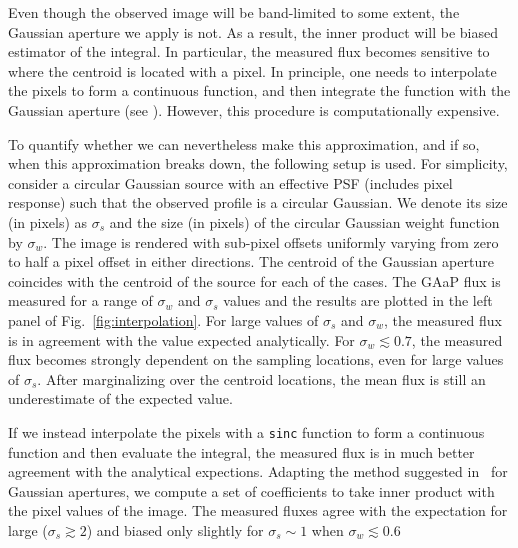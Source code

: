 \documentclass[DM,lsstdraft, authoryear,toc]{lsstdoc}
\begin{document}
Even though the observed image will be band-limited to some extent, the Gaussian aperture we apply is not.
As a result, the inner product will be biased estimator of the integral.
In particular, the measured flux becomes sensitive to where the centroid is located with a pixel.
In principle, one needs to interpolate the pixels to form a continuous function, and then integrate the function with the Gaussian aperture (see \cite{2013MNRAS.431.1275B}).
However, this procedure is computationally expensive.


To quantify whether we can nevertheless make this approximation, and if so, when this approximation breaks down, the following setup is used.
For simplicity, consider a circular Gaussian source with an effective PSF (includes pixel response) such that the observed profile is a circular Gaussian.
We denote its size (in pixels) as $\sigma_s$ and the size (in pixels) of the circular Gaussian weight function by $\sigma_w$.
The image is rendered with sub-pixel offsets uniformly varying from zero to half a pixel offset in either directions.
The centroid of the Gaussian aperture coincides with the centroid of the source for each of the cases.
The GAaP flux is measured for a range of $\sigma_w$ and $\sigma_s$ values and the results are plotted in the left panel of Fig.~\ref{fig:interpolation}.
For large values of $\sigma_s$ and $\sigma_w$, the measured flux is in agreement with the value expected analytically.
For $\sigma_w \lesssim 0.7$, the measured flux becomes strongly dependent on the sampling locations, even for large values of $\sigma_s$.
After marginalizing over the centroid locations, the mean flux is still an underestimate of the expected value.

If we instead interpolate the pixels with a \texttt{sinc} function to form a continuous function and then evaluate the integral, the measured flux is in much better agreement with the analytical expections.
Adapting the method suggested in~\cite{2013MNRAS.431.1275B} for Gaussian apertures, we compute a set of coefficients to take inner product with the pixel values of the image.
The measured fluxes agree with the expectation for large ($\sigma_s \gtrsim 2$) and biased only slightly for $\sigma_s \sim 1$ when $\sigma_w \lesssim 0.6$
\end{document}
